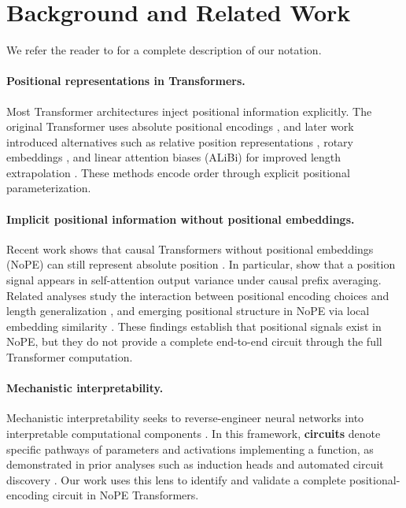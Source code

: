 \documentclass{article}
\theoremstyle{plain}
\theoremstyle{definition}
\theoremstyle{remark}
\begin{document}
\section{Background and Related Work}
\label{sec:background}
We refer the reader to  for a complete description of our notation.%

\paragraph{Positional representations in Transformers.}
Most Transformer architectures inject positional information explicitly.
The original Transformer uses absolute positional encodings \citep{vaswani2017attention}, and later work introduced alternatives such as relative position representations \citep{shaw2018self}, rotary embeddings \citep{wang2021rotary}, and linear attention biases (ALiBi) for improved length extrapolation \citep{alibi}.
These methods encode order through explicit positional parameterization.

\paragraph{Implicit positional information without positional embeddings.}
Recent work shows that causal Transformers without positional embeddings (NoPE) can still represent absolute position \citep{haviv2022transformer}.
In particular, \citet{chi-etal-2023-latent} show that a position signal appears in self-attention output variance under causal prefix averaging.
Related analyses study the interaction between positional encoding choices and length generalization \citep{kazemnejad2023lenghGeneralization}, and emerging positional structure in NoPE via local embedding similarity \citep{zuo2025position}.
These findings establish that positional signals exist in NoPE, but they do not provide a complete end-to-end circuit through the full Transformer computation.

\paragraph{Mechanistic interpretability.}
Mechanistic interpretability seeks to reverse-engineer neural networks into interpretable computational components \citep{elhage2021mathematical, elhage2022toy}.
In this framework, \textbf{circuits} denote specific pathways of parameters and activations implementing a function, as demonstrated in prior analyses such as induction heads \citep{olsson2022context} and automated circuit discovery \citep{conmy2023towards}.
Our work uses this lens to identify and validate a complete positional-encoding circuit in NoPE Transformers.
\end{document}
